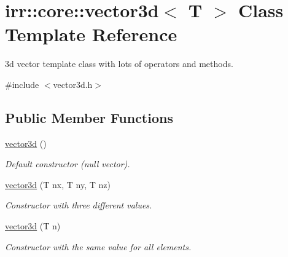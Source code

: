 \hypertarget{classirr_1_1core_1_1vector3d}{}\section{irr\+:\+:core\+:\+:vector3d$<$ T $>$ Class Template Reference}
\label{classirr_1_1core_1_1vector3d}


3d vector template class with lots of operators and methods.  




{\ttfamily \#include $<$vector3d.\+h$>$}

\subsection*{Public Member Functions}
\begin{DoxyCompactItemize}
\item 
\mbox{\label{classirr_1_1core_1_1vector3d_aed8875ec8b9653857ea87fdb8213daf1}} 
\hyperlink{classirr_1_1core_1_1vector3d_aed8875ec8b9653857ea87fdb8213daf1}{vector3d} ()
\begin{DoxyCompactList}\small\item\em Default constructor (null vector). \end{DoxyCompactList}\item 
\mbox{\label{classirr_1_1core_1_1vector3d_a10687f6e33f8f795961a9b8f0a71c79b}} 
\hyperlink{classirr_1_1core_1_1vector3d_a10687f6e33f8f795961a9b8f0a71c79b}{vector3d} (T nx, T ny, T nz)
\begin{DoxyCompactList}\small\item\em Constructor with three different values. \end{DoxyCompactList}\item 
\mbox{\label{classirr_1_1core_1_1vector3d_a08093c70044d66a5c3cdec2522b868f2}} 
\hyperlink{classirr_1_1core_1_1vector3d_a08093c70044d66a5c3cdec2522b868f2}{vector3d} (T n)
\begin{DoxyCompactList}\small\item\em Constructor with the same value for all elements. \end{DoxyCompactList}\item 
\mbox{\label{classirr_1_1core_1_1vector3d_a039600f48ce75c9eca6c0899135e60d5}} 

\end{DoxyCompactItemize}
